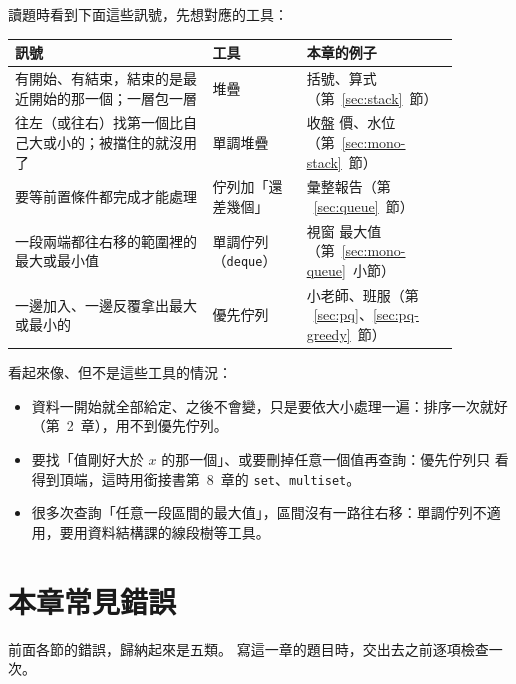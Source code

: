 讀題時看到下面這些訊號，先想對應的工具：

\begin{center}
\begin{tabular}{p{0.42\linewidth}p{0.2\linewidth}p{0.26\linewidth}}
\toprule
訊號 & 工具 & 本章的例子 \\
\midrule
有開始、有結束，結束的是最近開始的那一個；一層包一層 & 堆疊 & 括號、算式
（第~\ref{sec:stack}~節） \\
往左（或往右）找第一個比自己大或小的；被擋住的就沒用了 & 單調堆疊 & 收盤
價、水位（第~\ref{sec:mono-stack}~節） \\
要等前置條件都完成才能處理 & 佇列加「還差幾個」 & 彙整報告（第
~\ref{sec:queue}~節） \\
一段兩端都往右移的範圍裡的最大或最小值 & 單調佇列（\texttt{deque}） & 視窗
最大值（第~\ref{sec:mono-queue}~小節） \\
一邊加入、一邊反覆拿出最大或最小的 & 優先佇列 & 小老師、班服（第
~\ref{sec:pq}、\ref{sec:pq-greedy}~節） \\
\bottomrule
\end{tabular}
\end{center}

看起來像、但不是這些工具的情況：

\begin{itemize}
\item 資料一開始就全部給定、之後不會變，只是要依大小處理一遍：排序一次就好
（第~2~章），用不到優先佇列。
\item 要找「值剛好大於 $x$ 的那一個」、或要刪掉任意一個值再查詢：優先佇列只
看得到頂端，這時用銜接書第~8~章的 \texttt{set}、\texttt{multiset}。
\item 很多次查詢「任意一段區間的最大值」，區間沒有一路往右移：單調佇列不適
用，要用資料結構課的線段樹等工具。
\end{itemize}

\section{本章常見錯誤}
\label{sec:ch6-pitfalls}

前面各節的錯誤，歸納起來是五類。 寫這一章的題目時，交出去之前逐項檢查一次。

